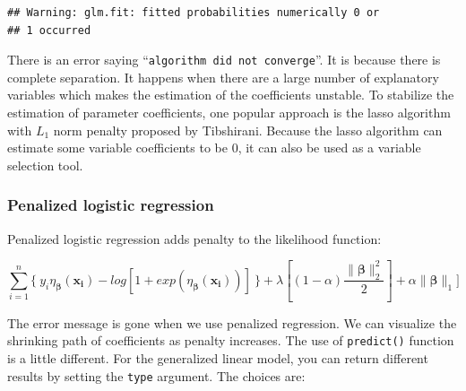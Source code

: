 \documentclass[12pt,]{krantz}
\makeatletter
\newenvironment{Shaded}{\begin{snugshade}}{\end{snugshade}}
\newcommand{\DataTypeTok}[1]{\textcolor[rgb]{0.27,0.27,0.27}{#1}}
\newcommand{\KeywordTok}[1]{\textcolor[rgb]{0.27,0.27,0.27}{\textbf{#1}}}
\newcommand{\NormalTok}[1]{#1}
\newcommand{\OperatorTok}[1]{\textcolor[rgb]{0.43,0.43,0.43}{\textbf{#1}}}
\newcommand{\StringTok}[1]{\textcolor[rgb]{0.5,0.5,0.5}{#1}}
\newenvironment{kframe}{%
\medskip{}
\setlength{\fboxsep}{.8em}
 \def\at@end@of@kframe{}%
 \ifinner\ifhmode%
  \def\at@end@of@kframe{\end{minipage}}%
  \begin{minipage}{\columnwidth}%
 \fi\fi%
 \def\FrameCommand##1{\hskip\@totalleftmargin \hskip-\fboxsep
 \colorbox{shadecolor}{##1}\hskip-\fboxsep
     \hskip-\linewidth \hskip-\@totalleftmargin \hskip\columnwidth}%
 \MakeFramed {\advance\hsize-\width
   \@totalleftmargin\z@ \linewidth\hsize
   \@setminipage}}%
 {\par\unskip\endMakeFramed%
 \at@end@of@kframe}
\renewenvironment{Shaded}{\begin{kframe}}{\end{kframe}}
\makeatother
\begin{document}
\begin{verbatim}
## Warning: glm.fit: fitted probabilities numerically 0 or
## 1 occurred
\end{verbatim}

There is an error saying ``\texttt{algorithm\ did\ not\ converge}''. It is because there is complete separation. It happens when there are a large number of explanatory variables which makes the estimation of the coefficients unstable. To stabilize the estimation of parameter coefficients, one popular approach is the lasso algorithm with \(L_1\) norm penalty proposed by Tibshirani\citep{Tibshirani1996}. Because the lasso algorithm can estimate some variable coefficients to be 0, it can also be used as a variable selection tool.

\hypertarget{penalized-logistic-regression-1}{%
\subsubsection{Penalized logistic regression}\label{penalized-logistic-regression-1}}

Penalized logistic regression adds penalty to the likelihood function:

\[
\sum_{i=1}^{n}\{\ y_{i}\eta_{\symbf{\beta}}(\mathbf{x_{i}})-log[1+exp(\eta_{\symbf{\beta}}(\mathbf{x_{i}}))]\ \}+\lambda [(1-\alpha) \frac{\parallel \symbf{\beta}\parallel_{2}^{2}}{2}] + \alpha \parallel \symbf{\beta}\parallel _{1} ]
\]

\begin{Shaded}
\end{Shaded}

The error message is gone when we use penalized regression. We can visualize the shrinking path of coefficients as penalty increases. The use of \texttt{predict()} function is a little different. For the generalized linear model, you can return different results by setting the \texttt{type} argument. The choices are:
\end{document}
